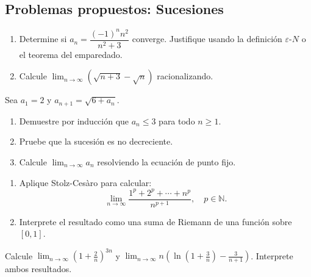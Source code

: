 \subsection{Problemas propuestos: Sucesiones}


\begin{prob}
\begin{enumerate}
  \item Determine si $a_n = \dfrac{(-1)^n n^2}{n^2+3}$ converge. Justifique
        usando la definición $\varepsilon$-$N$ o el teorema del emparedado.
  \item Calcule $\displaystyle\lim_{n\to\infty}(\sqrt{n+3}-\sqrt{n})$
        racionalizando.
\end{enumerate}
\end{prob}


\begin{prob}
Sea $a_1 = 2$ y $a_{n+1} = \sqrt{6 + a_n}$.
\begin{enumerate}
  \item Demuestre por inducción que $a_n \leq 3$ para todo $n \geq 1$.
  \item Pruebe que la sucesión es no decreciente.
  \item Calcule $\lim_{n\to\infty} a_n$ resolviendo la ecuación de punto
        fijo.
\end{enumerate}
\end{prob}

\begin{prob}
\begin{enumerate}
  \item Aplique Stolz-Cesàro para calcular:
  \[
    \lim_{n\to\infty} \frac{1^p + 2^p + \cdots + n^p}{n^{p+1}},
    \quad p \in \mathbb{N}.
  \]
  \item Interprete el resultado como una suma de Riemann de una función
        sobre $[0,1]$.
\end{enumerate}
\end{prob}

\begin{prob}
Calcule $\displaystyle\lim_{n\to\infty}\left(1+\frac{2}{n}\right)^{3n}$
y $\displaystyle\lim_{n\to\infty}n\!\left(\ln\!\left(1+\frac{3}{n}\right)
-\frac{3}{n+1}\right)$. Interprete ambos resultados.
\end{prob}

